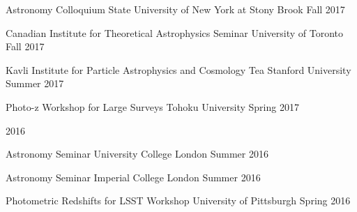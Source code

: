 \documentclass[11pt,letterpaper]{article}
\begin{document}
\begin{list}{}{\malzlist}
\begin{list}{}{\malzlist}
	{Astronomy Colloquium}
	{State University of New York at Stony Brook}
	{Fall 2017}
	\item {}
	{Canadian Institute for Theoretical Astrophysics Seminar}
	{University of Toronto}
	{Fall 2017}
	\item {}
	{Kavli Institute for Particle Astrophysics and Cosmology Tea}
	{Stanford University}
	{Summer 2017}
	\item {}
	{Photo-z Workshop for Large Surveys}
	{Tohoku University}
	{Spring 2017}
\end{list}
\item 2016
\nopagebreak\begin{list}{}{\malzlist}
	\item {}
	{Astronomy Seminar}
	{University College London}
	{Summer 2016}
	\item {}
	{Astronomy Seminar}
	{Imperial College London}
	{Summer 2016}
	\item {}
	{Photometric Redshifts for LSST Workshop}
	{University of Pittsburgh}
	{Spring 2016}
\end{list}
\end{list}
\end{document}
